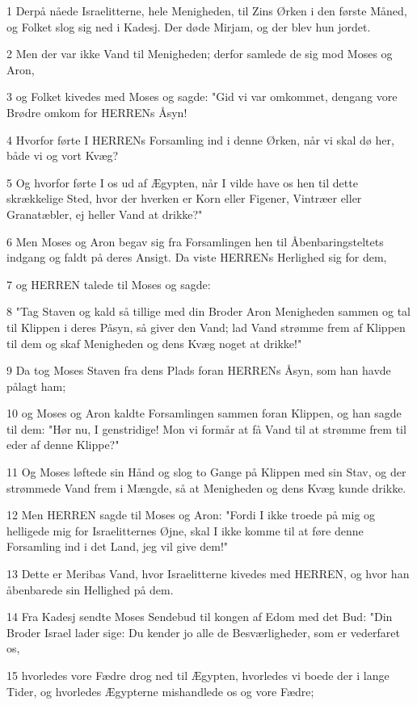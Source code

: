 \par 1 Derpå nåede Israelitterne, hele Menigheden, til Zins Ørken i den første Måned, og Folket slog sig ned i Kadesj. Der døde Mirjam, og der blev hun jordet.
\par 2 Men der var ikke Vand til Menigheden; derfor samlede de sig mod Moses og Aron,
\par 3 og Folket kivedes med Moses og sagde: "Gid vi var omkommet, dengang vore Brødre omkom for HERRENs Åsyn!
\par 4 Hvorfor førte I HERRENs Forsamling ind i denne Ørken, når vi skal dø her, både vi og vort Kvæg?
\par 5 Og hvorfor førte I os ud af Ægypten, når I vilde have os hen til dette skrækkelige Sted, hvor der hverken er Korn eller Figener, Vintræer eller Granatæbler, ej heller Vand at drikke?"
\par 6 Men Moses og Aron begav sig fra Forsamlingen hen til Åbenbaringsteltets indgang og faldt på deres Ansigt. Da viste HERRENs Herlighed sig for dem,
\par 7 og HERREN talede til Moses og sagde:
\par 8 "Tag Staven og kald så tillige med din Broder Aron Menigheden sammen og tal til Klippen i deres Påsyn, så giver den Vand; lad Vand strømme frem af Klippen til dem og skaf Menigheden og dens Kvæg noget at drikke!"
\par 9 Da tog Moses Staven fra dens Plads foran HERRENs Åsyn, som han havde pålagt ham;
\par 10 og Moses og Aron kaldte Forsamlingen sammen foran Klippen, og han sagde til dem: "Hør nu, I genstridige! Mon vi formår at få Vand til at strømme frem til eder af denne Klippe?"
\par 11 Og Moses løftede sin Hånd og slog to Gange på Klippen med sin Stav, og der strømmede Vand frem i Mængde, så at Menigheden og dens Kvæg kunde drikke.
\par 12 Men HERREN sagde til Moses og Aron: "Fordi I ikke troede på mig og helligede mig for Israelitternes Øjne, skal I ikke komme til at føre denne Forsamling ind i det Land, jeg vil give dem!"
\par 13 Dette er Meribas Vand, hvor Israelitterne kivedes med HERREN, og hvor han åbenbarede sin Hellighed på dem.
\par 14 Fra Kadesj sendte Moses Sendebud til kongen af Edom med det Bud: "Din Broder Israel lader sige: Du kender jo alle de Besværligheder, som er vederfaret os,
\par 15 hvorledes vore Fædre drog ned til Ægypten, hvorledes vi boede der i lange Tider, og hvorledes Ægypterne mishandlede os og vore Fædre;
